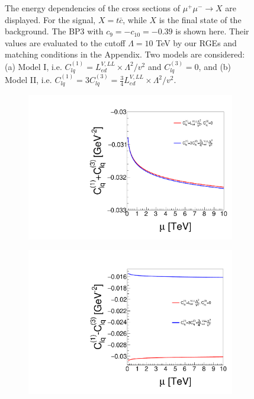 \documentclass[a4paper,11pt]{article}
\begin{document}
\begin{figure}
\begin{subfigure}[t]{0.45\textwidth}
     \caption{}
  \end{subfigure}
  \caption{The energy dependencies of the cross sections of $\mu^+\mu^-\to X$ are displayed. For the signal, $X=t\bar{c}$, while $X$ is the final state of the background. The BP3 with $c_{9}=-c_{10}=-0.39$ is shown here. Their values are evaluated to the cutoff $\Lambda=10$ TeV by our RGEs and matching conditions in the Appendix. Two models are considered: (a) Model I, i.e. $C^{(1)}_{lq}=L^{V,LL}_{ed}\times \Lambda^2/v^2$ and $C^{(3)}_{lq}=0$,  and (b) Model II, i.e. $C^{(1)}_{lq}=3C^{(3)}_{lq}=\frac{3}{4}L^{V,LL}_{ed}\times \Lambda^2/v^2$.\label{ecm}}
\end{figure}

\begin{figure}
  \centering
  \captionsetup[sub]{font=large}
  \begin{subfigure}[t]{0.45\textwidth}
     \includegraphics[width=\linewidth]{output_plus.pdf}
     \caption{}
  \end{subfigure}
  \begin{subfigure}[t]{0.45\textwidth}
     \includegraphics[width=\linewidth]{output_minus.pdf}

\end{subfigure}
\end{figure}
\end{document}
